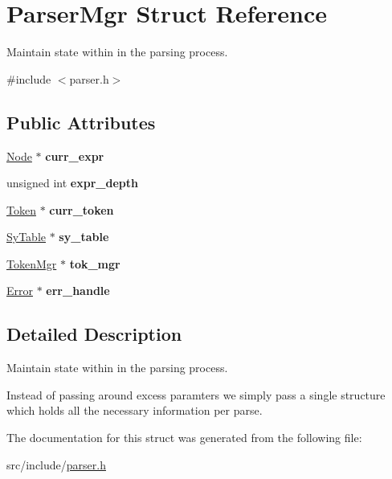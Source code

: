 \hypertarget{struct_parser_mgr}{}\section{Parser\+Mgr Struct Reference}
\label{struct_parser_mgr}


Maintain state within in the parsing process.  




{\ttfamily \#include $<$parser.\+h$>$}

\subsection*{Public Attributes}
\begin{DoxyCompactItemize}
\item 
\mbox{\label{struct_parser_mgr_a50b337b2185017f943a7ce0a7dc7e8f9}} 
\mbox{\hyperlink{struct_node}{Node}} $\ast$ {\bfseries curr\+\_\+expr}
\item 
\mbox{\label{struct_parser_mgr_ac10dc0846d693c106a2620b2906ed729}} 
unsigned int {\bfseries expr\+\_\+depth}
\item 
\mbox{\label{struct_parser_mgr_a2f91e648f300891d40e0fb2b903789c0}} 
\mbox{\hyperlink{struct_token}{Token}} $\ast$ {\bfseries curr\+\_\+token}
\item 
\mbox{\label{struct_parser_mgr_a62ecf294cfb5f6a769eb7602448da454}} 
\mbox{\hyperlink{struct_sy_table}{Sy\+Table}} $\ast$ {\bfseries sy\+\_\+table}
\item 
\mbox{\label{struct_parser_mgr_a2f758482ba8935ae5709f66d4295d320}} 
\mbox{\hyperlink{struct_token_mgr}{Token\+Mgr}} $\ast$ {\bfseries tok\+\_\+mgr}
\item 
\mbox{\label{struct_parser_mgr_a35287ee719c8ac8f666cc8ebc2ac7003}} 
\mbox{\hyperlink{struct_error}{Error}} $\ast$ {\bfseries err\+\_\+handle}
\end{DoxyCompactItemize}


\subsection{Detailed Description}
Maintain state within in the parsing process. 

Instead of passing around excess paramters we simply pass a single structure which holds all the necessary information per parse. 

The documentation for this struct was generated from the following file\+:\begin{DoxyCompactItemize}
\item 
src/include/\mbox{\hyperlink{parser_8h}{parser.\+h}}\end{DoxyCompactItemize}
